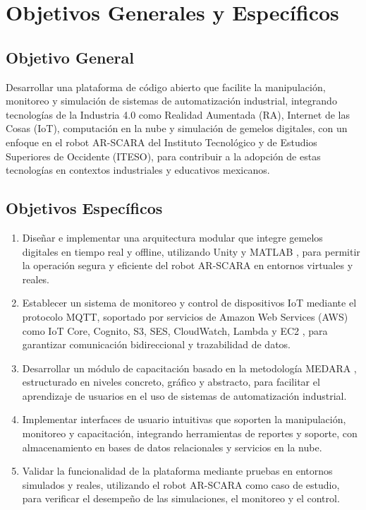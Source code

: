 \documentclass[12pt,letterpaper]{report}
\begin{document}
	\section{Objetivos Generales y Específicos}
	\subsection{Objetivo General}
	Desarrollar una plataforma de código abierto que facilite la manipulación, monitoreo y simulación de sistemas de automatización industrial, integrando tecnologías de la Industria 4.0 como Realidad Aumentada (RA), Internet de las Cosas (IoT), computación en la nube y simulación de gemelos digitales, con un enfoque en el robot AR-SCARA del Instituto Tecnológico y de Estudios Superiores de Occidente (ITESO), para contribuir a la adopción de estas tecnologías en contextos industriales y educativos mexicanos.
	\subsection{Objetivos Específicos}
	\begin{enumerate}
		\item Diseñar e implementar una arquitectura modular que integre gemelos digitales en tiempo real y offline, utilizando Unity y MATLAB \cite{mathworks_scara_2024}, para permitir la operación segura y eficiente del robot AR-SCARA en entornos virtuales y reales.
		\item Establecer un sistema de monitoreo y control de dispositivos IoT mediante el protocolo MQTT, soportado por servicios de Amazon Web Services (AWS) como IoT Core, Cognito, S3, SES, CloudWatch, Lambda y EC2 \cite{aws_iot_industrial_2024}, para garantizar comunicación bidireccional y trazabilidad de datos.
		\item Desarrollar un módulo de capacitación basado en la metodología MEDARA \cite{zamora_medara_2022}, estructurado en niveles concreto, gráfico y abstracto, para facilitar el aprendizaje de usuarios en el uso de sistemas de automatización industrial.
		\item Implementar interfaces de usuario intuitivas que soporten la manipulación, monitoreo y capacitación, integrando herramientas de reportes y soporte, con almacenamiento en bases de datos relacionales y servicios en la nube.
		\item Validar la funcionalidad de la plataforma mediante pruebas en entornos simulados y reales, utilizando el robot AR-SCARA como caso de estudio, para verificar el desempeño de las simulaciones, el monitoreo y el control.
	\end{enumerate}
	
\end{document}
